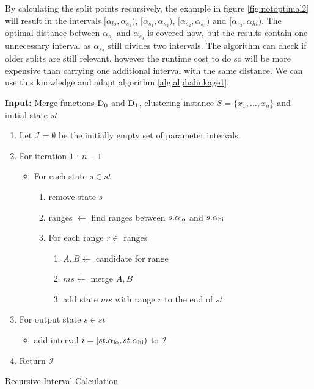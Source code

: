 By calculating the split points recursively, the example in figure \ref{fig:notoptimal2} will result in the intervals $[\alpha_{lo}, \alpha_{s_1})$, $[\alpha_{s_1}, \alpha_{s_2})$, $[\alpha_{s_2}, \alpha_{s_3})$ and $[\alpha_{s_3}, \alpha_{hi})$. The optimal distance between $\alpha_{s_1}$ and $\alpha_{s_3}$ is covered now, but the results contain one unnecessary interval as $\alpha_{s_2}$ still divides two intervals. The algorithm can check if older splits are still relevant, however the runtime cost to do so will be more expensive than carrying one additional interval with the same distance. We can use this knowledge and adapt algorithm \ref{alg:alphalinkage1}.

\begin{algorithm}
    \textbf{Input:} Merge functions $\operatorname{D_{0}}$ and $\operatorname{D_{1}}$, clustering instance $S = \{x_1, \dots, x_n\}$ and initial state $st$
    \begin{enumerate}[nosep, leftmargin=*]
    \item Let $\mathcal{I} = \emptyset$ be the initially empty set of parameter intervals.
    \item For iteration $1$ : $n-1$
    \begin{itemize}[nosep, leftmargin=*]
        \item For each state $s \in st$
        \begin{enumerate}[nosep, leftmargin=*]
            \item remove state $s$
            \item ranges $\gets$ find ranges between $s.\alpha_\text{lo}$ and $s.\alpha_\text{hi}$
            \item For each range $r \in$ ranges
            \begin{enumerate}
                \item $A, B \gets$ candidate for range
                \item $ms \gets$ merge $A, B$\;
                \item add state $ms$ with range $r$ to the end of $st$
            \end{enumerate}
        \end{enumerate}
    \end{itemize}
    \item For output state $s \in st$
            \begin{itemize}
                \item add interval $i = [st.\alpha_\text{lo}, st.\alpha_\text{hi})$ to $\mathcal{I}$
            \end{itemize}
        \item Return $\mathcal{I}$
    \end{enumerate}
    \caption{Recursive Interval Calculation}
    \label{alg:alphalinkage2}
\end{algorithm}

